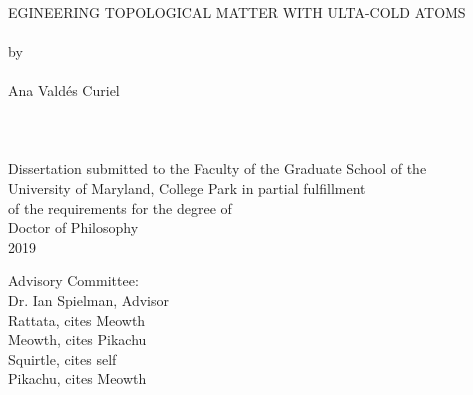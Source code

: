 
\thispagestyle{empty}
\hbox{\ }
\vspace{1in}
\renewcommand{\baselinestretch}{1}
\small\normalsize
\begin{center}

\large{{EGINEERING TOPOLOGICAL MATTER WITH ULTA-COLD ATOMS}}
\ \\
\ \\
\large{by} \\
\ \\
\large{Ana Vald\'es Curiel}%
\ \\
\ \\
\ \\
\ \\
\normalsize
Dissertation submitted to the Faculty of the Graduate School of the \\
University of Maryland, College Park in partial fulfillment \\
of the requirements for the degree of \\
Doctor of Philosophy \\
2019
\end{center}

\vspace{7.5em}

\noindent Advisory Committee: \\
Dr. Ian Spielman, Advisor \\
Rattata, cites Meowth \\
Meowth, cites Pikachu \\
Squirtle, cites self \\
Pikachu, cites Meowth
